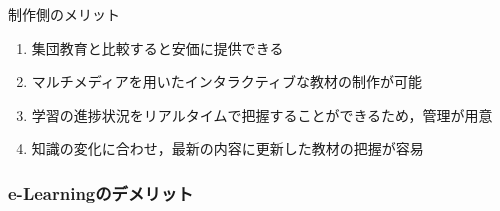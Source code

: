 \documentclass[a4j,12pt]{jsarticle}
\begin{document}
\begin{large}制作側のメリット\end{large}
\begin{enumerate}
\item 集団教育と比較すると安価に提供できる
\item マルチメディアを用いたインタラクティブな教材の制作が可能
\item 学習の進捗状況をリアルタイムで把握することができるため，管理が用意
\item 知識の変化に合わせ，最新の内容に更新した教材の把握が容易
\end{enumerate}

\subsubsection{e-Learningのデメリット}
\end{document}
